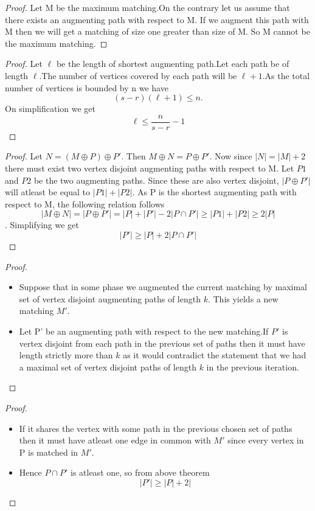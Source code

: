 \begin{proof} Let M be the maximum matching.On the contrary let us assume that there exists an augmenting path with respect to M. If we augment this path with M then we will get a matching of size one greater than size of M. So M cannot be the maximum matching.
\end{proof}

\begin{proof} Let $\ell$ be the length of shortest augmenting path.Let each path be of length $\ell$.The number of vertices covered by each path will be $\ell+1$.As the total number of vertices is bounded by n we have $$(s-r)(\ell +1) \leq n.$$
On simplification we get $$\ell \leq \frac{n}{s-r}-1$$
\end{proof}


\begin{proof}
 Let $N=(M \oplus P)\oplus P'$. Then $M \oplus N = P \oplus P'$. Now since $|N|=|M|+2$ there must exist two vertex disjoint augmenting paths with respect to M. Let $P1$ and $P2$ be the two augmenting paths. Since these are also vertex disjoint, $|P \oplus P'|$ will atleast be equal to $|P1|+|P2|$.
As P is the shortest augmenting path with respect to M, the following relation follows $$|M \oplus N|=|P\oplus P'|=|P|+|P'|-2|P \cap P'| \geq |P1|+|P2| \geq 2|P|$$. Simplifying we get $$ |P'| \geq |P|+2|P \cap P'|$$
\end{proof} 


\begin{proof}
\begin{itemize}

\item Suppose that in some phase we augmented the current matching by maximal set of vertex disjoint augmenting paths of length $k$. This yields a new matching $M'$.
\item Let P' be an augmenting path with respect to the new matching.If $P'$ is vertex disjoint from each path in the previous set of paths then it must have length strictly more than $k$ as it would contradict the statement that we had a maximal set of vertex disjoint paths of length $k$ in the previous iteration.
\end{itemize}
\end{proof}

\begin{frame}
\begin{proof}
\begin{itemize}

\item If it shares the vertex with some path in the previous chosen set of paths then it must have atleast one edge in common with $M'$ since every vertex in P is matched in $M'$.
\item Hence $P\cap P'$ is atleast one, so from above theorem $$|P'| \geq |P|+2|$$
\end{itemize}
\end{proof} 
\end{frame}


